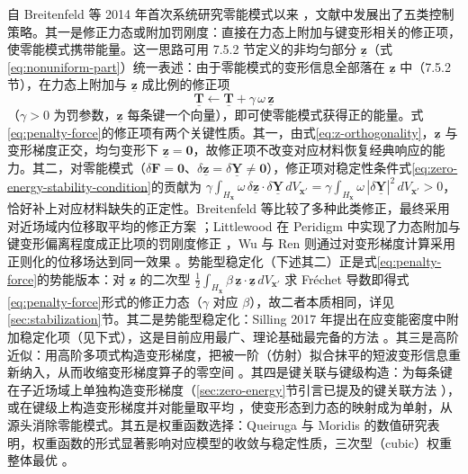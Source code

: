 自 Breitenfeld 等 2014 年首次系统研究零能模式以来 \cite{Breitenfeld2014}，文献中发展出了五类控制策略。其一是修正力态或附加罚刚度：直接在力态上附加与键变形相关的修正项，使零能模式携带能量。这一思路可用 7.5.2 节定义的非均匀部分 $\underline{\mathbf{z}}$（式\eqref{eq:nonuniform-part}）统一表述：由于零能模式的变形信息全部落在 $\underline{\mathbf{z}}$ 中（7.5.2 节），在力态上附加与 $\underline{\mathbf{z}}$ 成比例的修正项
\begin{equation}
  \underline{\mathbf{T}}\leftarrow\underline{\mathbf{T}}+\gamma\,\omega\,\underline{\mathbf{z}}
  \label{eq:penalty-force}
\end{equation}
（$\gamma>0$ 为罚参数，$\underline{\mathbf{z}}$ 每条键一个向量），即可使零能模式获得正的能量。式\eqref{eq:penalty-force}的修正项有两个关键性质。其一，由式\eqref{eq:z-orthogonality}，$\underline{\mathbf{z}}$ 与变形梯度正交，均匀变形下 $\underline{\mathbf{z}}=\mathbf{0}$，故修正项不改变对应材料恢复经典响应的能力。其二，对零能模式（$\delta\mathbf{F}=\mathbf{0}$、$\delta\underline{\mathbf{z}}=\delta\underline{\mathbf{Y}}\neq\mathbf{0}$），修正项对稳定性条件式\eqref{eq:zero-energy-stability-condition}的贡献为 $\gamma\int_{H_{\mathbf{x}}}\omega\,\delta\underline{\mathbf{z}}\cdot\delta\underline{\mathbf{Y}}\,dV_{\mathbf{x}'}=\gamma\int_{H_{\mathbf{x}}}\omega\,|\delta\underline{\mathbf{Y}}|^{2}\,dV_{\mathbf{x}'}>0$，恰好补上对应材料缺失的正定性。Breitenfeld 等比较了多种此类修正，最终采用对近场域内位移取平均的修正方案 \cite{Breitenfeld2014}；Littlewood 在 Peridigm 中实现了力态附加与键变形偏离程度成正比项的罚刚度修正 \cite{Littlewood2015}，Wu 与 Ren 则通过对变形梯度计算采用正则化的位移场达到同一效果 \cite{WuRen2015}。势能型稳定化（下述其二）正是式\eqref{eq:penalty-force}的势能版本：对 $\underline{\mathbf{z}}$ 的二次型 $\tfrac{1}{2}\int_{H_{\mathbf{x}}}\beta\,\underline{\mathbf{z}}\cdot\underline{\mathbf{z}}\,dV_{\mathbf{x}'}$ 求 Fréchet 导数即得式\eqref{eq:penalty-force}形式的修正力态（$\gamma$ 对应 $\beta$），故二者本质相同，详见 \ref{sec:stabilization}节。其二是势能型稳定化：Silling 2017 年提出在应变能密度中附加稳定化项（见下式），这是目前应用最广、理论基础最完备的方法 \cite{Silling2017}。其三是高阶近似：用高阶多项式构造变形梯度，把被一阶（仿射）拟合抹平的短波变形信息重新纳入，从而收缩变形梯度算子的零空间 \cite{YaghoobiChorzepa2017}。其四是键关联与键级构造：为每条键在子近场域上单独构造变形梯度（\ref{sec:zero-energy}节引言已提及的键关联方法 \cite{Chen2018}），或在键级上构造变形梯度并对能量取平均 \cite{BreitzmanDayal2018}，使变形态到力态的映射成为单射，从源头消除零能模式。其五是权重函数选择：Queiruga 与 Moridis 的数值研究表明，权重函数的形式显著影响对应模型的收敛与稳定性质，三次型（cubic）权重整体最优 \cite{QueirugaMoridis2017}。

